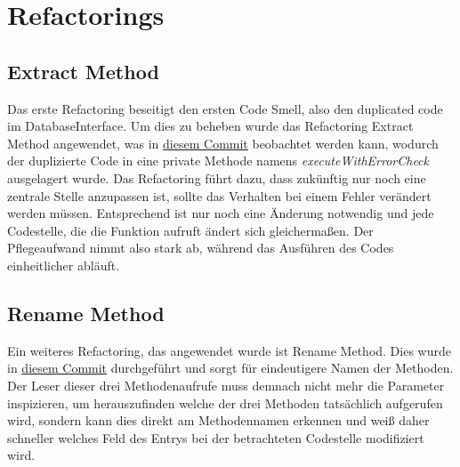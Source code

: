 \section{Refactorings}
\subsection{Extract Method}
Das erste Refactoring beseitigt den ersten Code Smell, also den duplicated code im DatabaseInterface. Um dies zu beheben wurde das Refactoring Extract Method angewendet, was in \href{https://github.com/moorts/Morik/commit/09ea85004227950dbf7d30e7bb6de26f92b1ea85}{diesem Commit} beobachtet werden kann, wodurch der duplizierte Code in eine private Methode namens \textit{executeWithErrorCheck} ausgelagert wurde. Das Refactoring führt dazu, dass zukünftig nur noch eine zentrale Stelle anzupassen ist, sollte das Verhalten bei einem Fehler verändert werden müssen. Entsprechend ist nur noch eine Änderung notwendig und jede Codestelle, die die Funktion aufruft ändert sich gleichermaßen. Der Pflegeaufwand nimmt also stark ab, während das Ausführen des Codes einheitlicher abläuft.

\subsection{Rename Method}
Ein weiteres Refactoring, das angewendet wurde ist Rename Method. Dies wurde in \href{https://github.com/moorts/Morik/commit/e807014b1ae894640a8a87f2765fa2ba5d95ea19}{diesem Commit} durchgeführt und sorgt für eindeutigere Namen der Methoden. Der Leser dieser drei Methodenaufrufe muss demnach nicht mehr die Parameter inspizieren, um herauszufinden welche der drei Methoden tatsächlich aufgerufen wird, sondern kann dies direkt am Methodennamen erkennen und weiß daher schneller welches Feld des Entrys bei der betrachteten Codestelle modifiziert wird.
